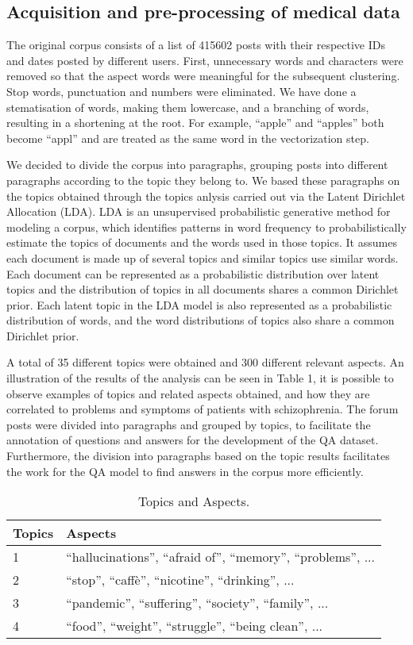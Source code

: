 \documentclass[runningheads]{llncs}
\begin{document}
\subsection{Acquisition and pre-processing of medical data}

The original corpus consists of a list of 415602 posts with their respective IDs and dates posted by different users.
First, unnecessary words and characters were removed so that the aspect words were meaningful for the subsequent clustering. Stop words, punctuation and numbers were eliminated.
We have done a stematisation of words, making them lowercase, and a branching of words, resulting in a shortening at the root. For example, ``apple'' and ``apples'' both become ``appl'' and are treated as the same word in the vectorization step.




We decided to divide the corpus into paragraphs, grouping posts into different paragraphs according to the topic they belong to. We based these paragraphs on the topics obtained through the topics anlysis carried out via the Latent Dirichlet Allocation (LDA)\cite{c17}. LDA is an unsupervised probabilistic generative method for modeling a corpus, which identifies patterns in word frequency to probabilistically estimate the topics of documents and the words used in those topics\cite{c17}. It assumes each document is made up of several topics and similar topics use similar words.
Each document can be represented as a probabilistic distribution over latent topics and the distribution of topics in all documents shares a common Dirichlet prior. Each latent topic in the LDA model is also represented as a probabilistic distribution of words, and the word distributions of topics also share a common Dirichlet prior\cite{c40}. 

A total of 35 different topics were obtained and 300 different relevant aspects.
An illustration of the results of the analysis can be seen in Table 1, it is possible to observe examples of topics and related aspects obtained, and how they are correlated to problems and symptoms of patients with schizophrenia.
The forum posts were divided into paragraphs and grouped by topics, to facilitate the annotation of questions and answers for the development of the QA dataset. Furthermore, the division into paragraphs based on the topic results facilitates the work for the QA model to find answers in the corpus more efficiently.

\begin{table}
 \centering
\caption{Topics and Aspects.}\label{tab1}
\begin{tabular}{|l|l|}
\hline
 Topics &  Aspects \\
\hline
1 &  ``hallucinations'', ``afraid of'', ``memory'', ``problems'', ...\\
2 &  ``stop'', ``caffè'', ``nicotine'', ``drinking'', ... \\
3 &  ``pandemic'', ``suffering'', ``society'', ``family'', ...\\
4 &  ``food'', ``weight'', ``struggle'', ``being clean'', ...\\
\hline
\end{tabular}
\end{table}
\end{document}
